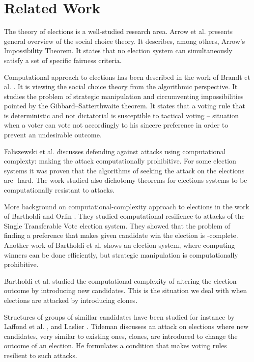 \section{Related Work}

The theory of elections is a well-studied research area.
Arrow et al. \cite{handbook} presents general overview of the social choice theory.
It describes, among others, Arrow's Impossibility Theorem.
It states that no election system can simultaneously satisfy a set of specific fairness criteria.

Computational approach to elections has been described in the work of
Brandt et al. \cite{compsocialchoice}.
It is viewing the social choice theory from the algorithmic perspective.
It studies the problem of strategic manipulation
and circumventing impossibilities pointed by the Gibbard–Satterthwaite theorem.
It states that a voting rule that is deterministic and not dictatorial is susceptible to tactical voting
-- situation when a voter can vote not accordingly to his sincere preference in order to prevent an undesirable outcome.

Faliszewski et al. \cite{usingcomplexity} discusses defending against attacks using computational complexty:
making the attack computationally prohibitive.
For some election systems it was proven that the algorithms of seeking the attack on the elections are \np-hard.
The work studied also dichotomy theorems for elections systems to be computationally resistant to attacks.

More background on computational-complexity approach to elections in the work of Bartholdi and Orlin \cite{usingcomp1}.
They studied computational resilience to attacks of the Single Transferable Vote election system.
They showed that the problem of finding a preference that makes given candidate win the election is \np-complete.
Another work of Bartholdi et al. \cite{usingcomp2} shows an election system,
where computing winners can be done efficiently, but strategic manipulation is computationally prohibitive.

Bartholdi et al. \cite{controlbyadding} studied the computational complexity of altering the election
outcome by introducing new candidates.
This is the situation we deal with when elections are attacked by introducing clones.

Structures of groups of simillar candidates have been studied for instance by
Laffond et al. \cite{clones1}, and Laslier \cite{clones2, clones3}.
Tideman \cite{independenceofclones} discusses an attack on elections where new candidates,
very similar to existing ones, clones, are introduced to change the outcome of an election.
He formulates a condition that makes voting rules resilient to such attacks.

